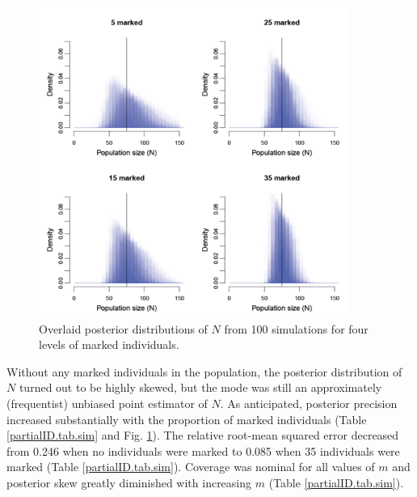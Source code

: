 \begin{figure}[ht]
  \centering
  \includegraphics[width=4in,height=4in]{Ch19-PartialID/figs/Nposts2.png}
  \caption{Overlaid posterior distributions of $N$ from 100 simulations
    for four levels of marked individuals.}
  \label{partialID.fig.nposts}
\end{figure}

Without any marked individuals in the population, the posterior
distribution of $N$ turned out to be highly skewed, but the mode was
still an approximately (frequentist) unbiased point estimator of
$N$. As anticipated, posterior precision increased substantially with
the proportion of marked individuals (Table \ref{partialID.tab.sim} and
Fig. \ref{partialID.fig.nposts}). The relative root-mean squared
error decreased from 0.246 when no individuals were marked to 0.085
when 35 individuals were marked
(Table \ref{partialID.tab.sim}). Coverage was nominal for all values of
$m$ and posterior skew greatly diminished with increasing $m$ (Table \ref{partialID.tab.sim}).


